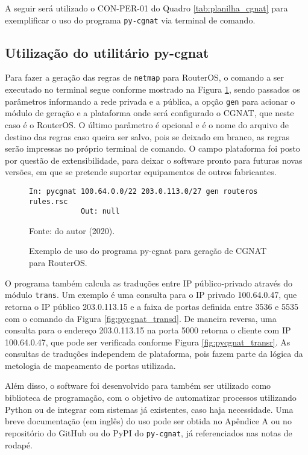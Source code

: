     A seguir será utilizado o CON-PER-01 do Quadro \ref{tab:planilha_cgnat} para exemplificar o uso do programa {\tt py-cgnat} via terminal de comando. 
    
\subsection{Utilização do utilitário py-cgnat}
    
    Para fazer a geração das regras de {\tt netmap} para RouterOS, o comando a ser executado no terminal segue conforme mostrado na Figura \ref{fig:pycgnat_gen}, sendo passados os parâmetros informando a rede privada e a pública, a opção {\tt gen} para acionar o módulo de geração e a plataforma onde será configurado o CGNAT, que neste caso é o RouterOS. O último parâmetro é opcional e é o nome do arquivo de destino das regras caso queira ser salvo, pois se deixado em branco, as regras serão impressas no próprio terminal de comando. O campo plataforma foi posto por questão de extensibilidade, para deixar o software pronto para futuras novas versões, em que se pretende suportar equipamentos de outros fabricantes.
    
    \begin{figure}[!htb]
        \centering
        \caption{Exemplo de uso do programa py-cgnat para geração de CGNAT para RouterOS.} 
        \label{fig:pycgnat_gen}
        
        \begin{Verbatim}[fontsize=\small]
            In: pycgnat 100.64.0.0/22 203.0.113.0/27 gen routeros rules.rsc
            Out: null
        \end{Verbatim} 

        {\small Fonte: do autor (2020).} 
    \end{figure}
    
    O programa também calcula as traduções entre IP público-privado através do módulo {\tt trans}. Um exemplo é uma consulta para o IP privado 100.64.0.47, que retorna o IP público 203.0.113.15 e a faixa de portas definida entre 3536 e 5535 com o comando da Figura \ref{fig:pycgnat_transd}. De maneira reversa, uma consulta para o endereço 203.0.113.15 na porta 5000 retorna o cliente com IP 100.64.0.47, que pode ser verificada conforme Figura \ref{fig:pycgnat_transr}. As consultas de traduções independem de plataforma, pois fazem parte da lógica da metologia de mapeamento de portas utilizada. 
    
    Além disso, o software foi desenvolvido para também ser utilizado como biblioteca de programação, com o objetivo de automatizar processos utilizando Python ou de integrar com sistemas já existentes, caso haja necessidade. Uma breve documentação (em inglês) do uso pode ser obtida no Apêndice A ou no repositório do GitHub ou do PyPI do {\tt py-cgnat}, já referenciados nas notas de rodapé.
    
